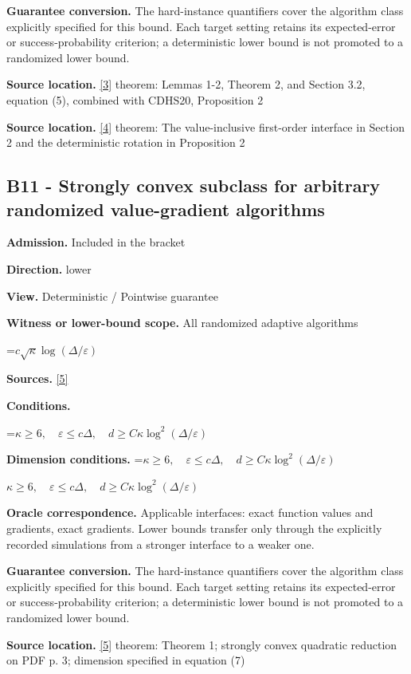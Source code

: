 \documentclass[10pt,a4paper]{article}
\newcommand{\AtlasMath}[1]{\par\begingroup\centering\setbox0=\hbox{$\displaystyle #1$}\ifdim\wd0>1.4\linewidth\typeout{ATLAS WIDE FORMULA: \the\wd0}\fi\ifdim\wd0>\linewidth\resizebox{\linewidth}{!}{\box0}\else\box0\fi\par\endgroup}
\newcommand{\AtlasInlineMath}[1]{\begingroup\setbox0=\hbox{$#1$}\ifdim\wd0>.4\linewidth\endgroup\AtlasMath{#1}\else\endgroup$#1$\fi}
\begin{document}
\textbf{Guarantee conversion.} The hard-instance quantifiers cover the algorithm class explicitly specified for this bound. Each target setting retains its expected-error or success-probability criterion; a deterministic lower bound is not promoted to a randomized lower bound.

\textbf{Source location.} \href{https://arxiv.org/pdf/2212.13551}{[3]} theorem: Lemmas 1-2, Theorem 2, and Section 3.2, equation (5), combined with CDHS20, Proposition 2

\textbf{Source location.} \href{https://arxiv.org/pdf/1710.11606}{[4]} theorem: The value-inclusive first-order interface in Section 2 and the deterministic rotation in Proposition 2

\subsection{B11 - Strongly convex subclass for arbitrary randomized value-gradient algorithms}
\textbf{Admission.} Included in the bracket

\textbf{Direction.} lower

\textbf{View.} Deterministic / Pointwise guarantee

\textbf{Witness or lower-bound scope.} All randomized adaptive algorithms

\AtlasMath{c\sqrt\kappa\log(\Delta/\varepsilon)}
\textbf{Sources.} \href{https://arxiv.org/pdf/2609.10874}{[5]}

\textbf{Conditions.} 
\AtlasMath{\kappa\ge6,\quad\varepsilon\le c\Delta,\quad d\ge C\kappa\log^2(\Delta/\varepsilon)}


\textbf{Dimension conditions.} \AtlasInlineMath{\kappa\ge6,\quad\varepsilon\le c\Delta,\quad d\ge C\kappa\log^2(\Delta/\varepsilon)}

\textbf{Oracle correspondence.} Applicable interfaces: exact function values and gradients, exact gradients. Lower bounds transfer only through the explicitly recorded simulations from a stronger interface to a weaker one.

\textbf{Guarantee conversion.} The hard-instance quantifiers cover the algorithm class explicitly specified for this bound. Each target setting retains its expected-error or success-probability criterion; a deterministic lower bound is not promoted to a randomized lower bound.

\textbf{Source location.} \href{https://arxiv.org/pdf/2609.10874}{[5]} theorem: Theorem 1; strongly convex quadratic reduction on PDF p. 3; dimension specified in equation (7)
\end{document}
